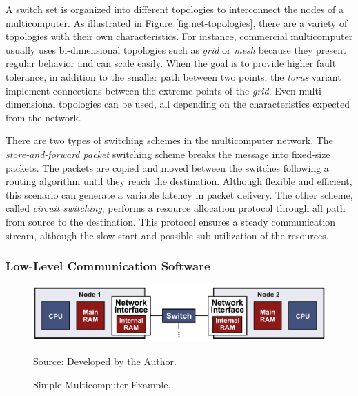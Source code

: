 				A switch set is organized into different topologies to interconnect
				the nodes of a multicomputer.
				As illustrated in Figure \ref{fig.net-topologies}, there are a
				variety of topologies with their own characteristics.
				For instance, commercial multicomputer usually uses bi-dimensional
				topologies such as \textit{grid} or \textit{mesh} because they present
				regular behavior and can scale easily.
				When the goal is to provide higher fault tolerance, in addition to the
				smaller path between two points, the \textit{torus} variant implement
				connections between the extreme points of the \textit{grid}.
				Even multi-dimensional topologies can be used, all depending on the
				characteristics expected from the network.

				There are two types of switching schemes in the multicomputer network.
				The \textit{store-and-forward packet} switching scheme breaks the message
				into fixed-size packets.
				The packets are copied and moved between the switches following a
				routing algorithm until they reach the destination.
				Although flexible and efficient, this scenario can generate a variable
				latency in packet delivery.
				The other scheme, called \textit{circuit switching}, performs a resource
				allocation protocol through all path from source to the destination.
				This protocol ensures a steady communication stream, although the
				slow start and possible sub-utilization of the resources.

			\subsubsection{Low-Level Communication Software}
			\label{sec.multicomputers-low-sw}

				\begin{figure}[h]
					\centering
					\caption{Simple Multicomputer Example.}%

					\includegraphics[width=.9\textwidth]{images/multicomputer.pdf}

					Source: Developed by the Author.

					\label{fig.multicomputer}
				\end{figure}

